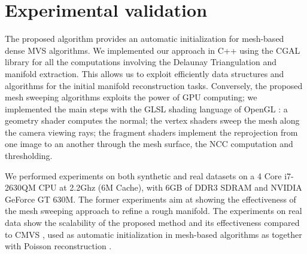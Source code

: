 \section{Experimental validation}
The proposed algorithm provides an automatic initialization for mesh-based dense MVS algorithms.
We implemented our approach in C++ using the CGAL library \cite{cgal} for all the computations involving the Delaunay Triangulation and manifold extraction. This allows us to exploit efficiently data structures and algorithms for the initial manifold reconstruction tasks.
Conversely, the proposed mesh sweeping algorithms exploits the power of GPU computing; we implemented the main steps with the GLSL shading language of OpenGL \cite{opengl}: a geometry shader computes the normal; the vertex shaders sweep the mesh along the camera viewing rays; the fragment shaders implement the reprojection from one image to an another through the mesh surface, the NCC computation and thresholding.


We performed experiments on both synthetic and real datasets on a 4 Core i7-2630QM CPU at 2.2Ghz (6M Cache), with 6GB of DDR3 SDRAM and NVIDIA GeForce GT 630M. The former experiments aim at showing the effectiveness of the mesh sweeping approach to refine a rough manifold.
The experiments on real data show the scalability of the proposed method and its effectiveness compared to CMVS \cite{fu10}, used as automatic initialization in mesh-based algorithms as \cite{pan2015automatic,li2015detail} together with Poisson reconstruction \cite{kazhdan2006poisson}. 

